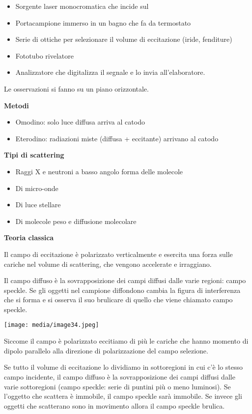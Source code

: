 \begin{itemize}
\item
  Sorgente laser monocromatica che incide sul
\item
  Portacampione immerso in un bagno che fa da termostato
\item
  Serie di ottiche per selezionare il volume di eccitazione (iride,
  fenditure)
\item
  Fototubo rivelatore
\item
  Analizzatore che digitalizza il segnale e lo invia all'elaboratore.
\end{itemize}

Le osservazioni si fanno su un piano orizzontale.

\textbf{Metodi}

\begin{itemize}
\item
  Omodino: solo luce diffusa arriva al catodo
\item
  Eterodino: radiazioni miste (diffusa + eccitante) arrivano al catodo
\end{itemize}

\textbf{Tipi di scattering}

\begin{itemize}
\item
  Raggi X e neutroni a basso angolo forma delle molecole
\item
  Di micro-onde
\item
  Di luce stellare
\item
  Di molecole peso e diffusione molecolare
\end{itemize}

\textbf{Teoria classica}

Il campo di eccitazione è polarizzato verticalmente e esercita una forza
sulle cariche nel volume di scattering, che vengono accelerate e
irraggiano.

Il campo diffuso è la sovrapposizione dei campi diffusi dalle varie
regioni: campo speckle. Se gli oggetti nel campione diffondono cambia la
figura di interferenza che si forma e si osserva il suo brulicare di
quello che viene chiamato campo speckle.

\texttt{[image: media/image34.jpeg]}

Siccome il campo è polarizzato eccitiamo di più le cariche che hanno
momento di dipolo parallelo alla direzione di polarizzazione del campo
selezione.

Se tutto il volume di eccitazione lo dividiamo in sottoregioni in cui
c'è lo stesso campo incidente, il campo diffuso è la sovrapposizione dei
campi diffusi dalle varie sottoregioni (campo speckle: serie di puntini
più o meno luminosi). Se l'oggetto che scattera è immobile, il campo
speckle sarà immobile. Se invece gli oggetti che scatterano sono in
movimento allora il campo speckle brulica.

